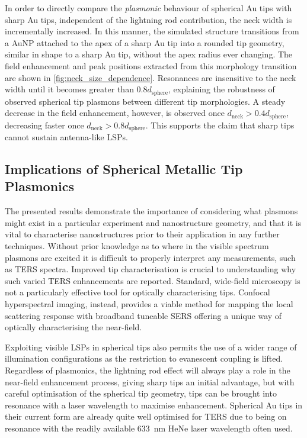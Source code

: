 \documentclass{article}
\begin{document}
In order to directly compare the \emph{plasmonic} behaviour of spherical Au tips with sharp Au tips, independent of the lightning rod contribution, the neck width is incrementally increased. In this manner, the simulated structure transitions from a AuNP attached to the apex of a sharp Au tip into a rounded tip geometry, similar in shape to a sharp Au tip, without the apex radius ever changing.
The field enhancement and peak positions extracted from this morphology transition are shown in \autoref{fig:neck_size_dependence}. Resonances are insensitive to the neck width until it becomes greater than $0.8d_{\mathrm{sphere}}$, explaining the robustness of observed spherical tip plasmons between different tip morphologies. A steady decrease in the field enhancement, however, is observed once $d_{\mathrm{neck}}>0.4d_{\mathrm{sphere}}$, decreasing faster once $d_{\mathrm{neck}}>0.8d_{\mathrm{sphere}}$. This supports the claim that sharp tips cannot sustain antenna-like LSPs.

\subsection{Implications of Spherical Metallic Tip Plasmonics}

The presented results demonstrate the importance of considering what plasmons might exist in a particular experiment and nanostructure geometry, and that it is vital to characterise nanostructures prior to their application in any further techniques. Without prior knowledge as to where in the visible spectrum plasmons are excited it is difficult to properly interpret any measurements, such as TERS spectra. Improved tip characterisation is crucial to understanding why such varied TERS enhancements are reported. Standard, wide-field microscopy is not a particularly effective tool for optically characterising tips. Confocal hyperspectral imaging, instead, provides a viable method for mapping the local scattering response with broadband tuneable SERS offering a unique way of optically characterising the near-field.

Exploiting visible LSPs in spherical tips also permits the use of a wider range of illumination configurations as the restriction to evanescent coupling is lifted. Regardless of plasmonics, the lightning rod effect will always play a role in the near-field enhancement process, giving sharp tips an initial advantage, but with careful optimisation of the spherical tip geometry, tips can be brought into resonance with a laser wavelength to maximise enhancement. Spherical Au tips in their current form are already quite well optimised for TERS due to being on resonance with the readily available \SI{633}{nm} HeNe laser wavelength often used.
\end{document}
